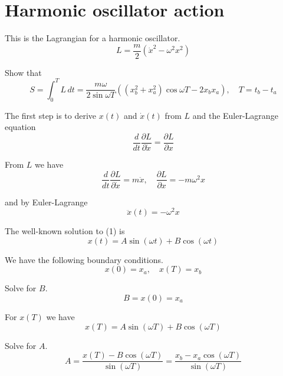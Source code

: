 

\section*{Harmonic oscillator action}

This is the Lagrangian for a harmonic oscillator.
\begin{equation*}
L=\frac{m}{2}(\dot x^2-\omega^2x^2)
\end{equation*}

Show that
\begin{equation*}
S=\int_0^TL\,dt=\frac{m\omega}{2\sin\omega T}
\left((x_b^2+x_a^2)\cos\omega T-2x_bx_a\right),\quad
T=t_b-t_a
\end{equation*}

The first step is to derive $x(t)$ and $\dot x(t)$ from $L$ and the Euler-Lagrange equation
\begin{equation*}
\frac{d}{dt}\frac{\partial L}{\partial\dot x}=\frac{\partial L}{\partial x}
\end{equation*}

From $L$ we have
\begin{equation*}
\frac{d}{dt}\frac{\partial L}{\partial\dot x}=m\ddot x,\quad
\frac{\partial L}{\partial x}=-m\omega^2x
\end{equation*}

and by Euler-Lagrange
\begin{equation*}
\ddot x(t)=-\omega^2x
\tag{1}
\end{equation*}

The well-known solution to (1) is
\begin{equation*}
x(t)=A\sin(\omega t)+B\cos(\omega t)
\end{equation*}

We have the following boundary conditions.
\begin{equation*}
x(0)=x_a,\quad
x(T)=x_b
\tag{2}
\end{equation*}

Solve for $B$.
\begin{equation*}
B=x(0)=x_a
\end{equation*}

For $x(T)$ we have
\begin{equation*}
x(T)=A\sin(\omega T)+B\cos(\omega T)
\end{equation*}

Solve for $A$.
\begin{equation*}
A=\frac{x(T)-B\cos(\omega T)}{\sin(\omega T)}=
\frac{x_b-x_a\cos(\omega T)}{\sin(\omega T)}
\end{equation*}

